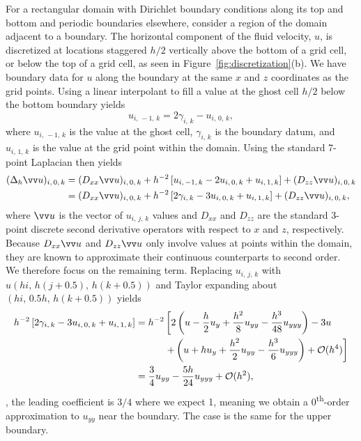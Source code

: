 For a rectangular domain with Dirichlet boundary conditions along its top and bottom and
periodic boundaries elsewhere, consider a region of the domain adjacent to a boundary.
The horizontal component of the fluid velocity, $u$, is discretized at locations
staggered $h/2$ vertically above the bottom of a grid cell, or below the top of a grid
cell, as seen in Figure~\ref{fig:discretization}(b). We have boundary data for $u$ along
the boundary at the same $x$ and $z$ coordinates as the grid points. Using a linear
interpolant to fill a value at the ghost cell $h/2$ below the bottom boundary yields
\begin{equation}\label{eq:ghost}
    u_{i,\,-1,\,k} = 2\gamma_{i,\,k} - u_{i,\,0,\,k},
\end{equation}
where $u_{i,\,-1,\,k}$ is the value at the ghost cell, $\gamma_{i,\,k}$ is the boundary
datum, and $u_{i,\,1,\,k}$ is the value at the grid point within the domain. Using the
standard 7-point Laplacian then yields
\begin{equation}\label{eq:disc-lap}
    \begin{aligned}
        (\laplacian_h \arr{u})_{i,\,0,\,k}
        &= (D_{xx}\arr{u})_{i,\,0,\,k} + h^{-2}\left[u_{i,\,-1,\,k} - 2u_{i,\,0,\,k} + u_{i,\,1,\,k}\right] + (D_{zz}\arr{u})_{i,\,0,\,k} \\
        &= (D_{xx}\arr{u})_{i,\,0,\,k} + h^{-2}\left[2\gamma_{i,\,k} - 3u_{i,\,0,\,k} + u_{i,\,1,\,k}\right] + (D_{zz}\arr{u})_{i,\,0,\,k},
    \end{aligned}
\end{equation}
where $\arr{u}$ is the vector of $u_{i,\,j,\,k}$ values and $D_{xx}$ and $D_{zz}$ are the
standard 3-point discrete second derivative operators with respect to $x$ and $z$,
respectively. Because $D_{xx}\arr{u}$ and $D_{zz}\arr{u}$ only involve values at points
within the domain, they are known to approximate their continuous counterparts to second
order. We therefore focus on the remaining term. Replacing $u_{i,\,j,\,k}$ with
$u(hi,\,h(j+0.5),\,h(k+0.5))$ and Taylor expanding about $(hi,\,0.5h,\,h(k+0.5))$ yields
\begin{equation}\label{eq:expansion}
    \begin{aligned}
    h^{-2}\left[2\gamma_{i,\,k} - 3u_{i,\,0,\,k} + u_{i,\,1,\,k}\right]
    &= h^{-2}\left[2\left(u - \frac{h}{2}u_y + \frac{h^2}{8}u_{yy} - \frac{h^3}{48}u_{yyy}\right) - 3u\right. \\
    &\hphantom{=h^{-2}[}\left.+ \left(u + hu_y + \frac{h^2}{2}u_{yy} - \frac{h^3}{6}u_{yyy}\right)+\mathcal{O}(h^4)\right] \\
    &= \frac34u_{yy} - \frac{5h}{24}u_{yyy} + \mathcal{O}(h^2),
    \end{aligned}
\end{equation}
, the leading coefficient is $3/4$ where we expect 1, meaning we obtain a
0\textsuperscript{th}-order approximation to $u_{yy}$ near the boundary. The case is the
same for the upper boundary.

